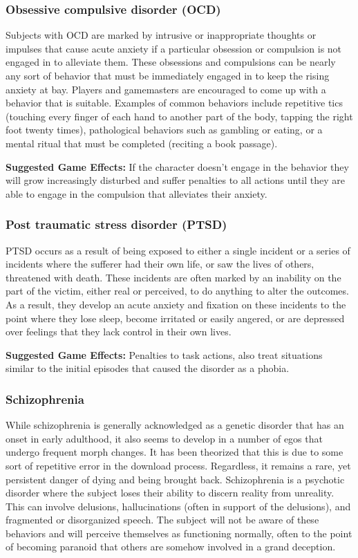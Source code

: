 \subsubsection{Obsessive compulsive disorder (OCD)}

Subjects with OCD are marked by intrusive or inappropriate thoughts or impulses that cause acute anxiety if a particular obsession or compulsion is not engaged in to alleviate them. These obsessions and compulsions can be nearly any sort of behavior that must be immediately engaged in to keep the rising anxiety at bay. Players and gamemasters are encouraged to come up with a behavior that is suitable. Examples of common behaviors include repetitive tics (touching every finger of each hand to another part of the body, tapping the right foot twenty times), pathological behaviors such as gambling or eating, or a mental ritual that must be completed (reciting a book passage).

\textbf{Suggested Game Effects:} If the character doesn’t engage in the behavior they will grow increasingly disturbed and suffer penalties to all actions until they are able to engage in the compulsion that alleviates their anxiety.

\subsubsection{Post traumatic stress disorder (PTSD)}

PTSD occurs as a result of being exposed to either a single incident or a series of incidents where the sufferer had their own life, or saw the lives of others, threatened with death. These incidents are often marked by an inability on the part of the victim, either real or perceived, to do anything to alter the outcomes. As a result, they develop an acute anxiety and fixation on these incidents to the point where they lose sleep, become irritated or easily angered, or are depressed over feelings that they lack control in their own lives.

\textbf{Suggested Game Effects:} Penalties to task actions, also treat situations similar to the initial episodes that caused the disorder as a phobia.

\subsubsection{Schizophrenia}

While schizophrenia is generally acknowledged as a genetic disorder that has an onset in early adulthood, it also seems to develop in a number of egos that undergo frequent morph changes. It has been theorized that this is due to some sort of repetitive error in the download process. Regardless, it remains a rare, yet persistent danger of dying and being brought back. Schizophrenia is a psychotic disorder where the subject loses their ability to discern reality from unreality. This can involve delusions, hallucinations (often in support of the delusions), and fragmented or disorganized speech. The subject will not be aware of these behaviors and will perceive themselves as functioning normally, often to the point of becoming paranoid that others are somehow involved in a grand deception.

